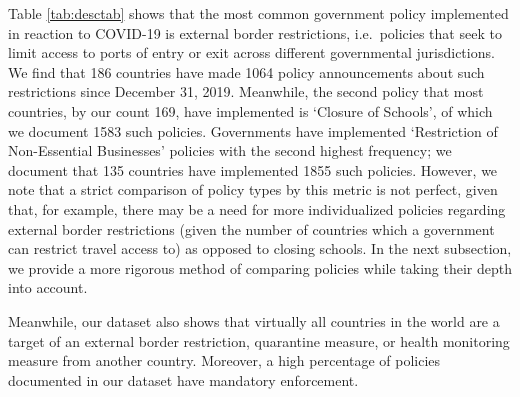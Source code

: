 \documentclass[]{article}
\begin{document}
Table \ref{tab:desctab} shows that the most common government policy implemented in reaction to COVID-19 is external border restrictions, i.e.~policies that seek to limit access to ports of entry or exit across different governmental jurisdictions. We find that 186 countries have made 1064 policy announcements about such restrictions since December 31, 2019. Meanwhile, the second policy that most countries, by our count 169, have implemented is `Closure of Schools', of which we document 1583 such policies. Governments have implemented `Restriction of Non-Essential Businesses' policies with the second highest frequency; we document that 135 countries have implemented 1855 such policies. However, we note that a strict comparison of policy types by this metric is not perfect, given that, for example, there may be a need for more individualized policies regarding external border restrictions (given the number of countries which a government can restrict travel access to) as opposed to closing schools. In the next subsection, we provide a more rigorous method of comparing policies while taking their depth into account.

Meanwhile, our dataset also shows that virtually all countries in the world are a target of an external border restriction, quarantine measure, or health monitoring measure from another country. Moreover, a high percentage of policies documented in our dataset have mandatory enforcement.
\end{document}
